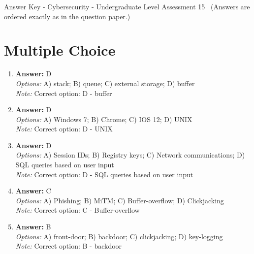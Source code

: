 \documentclass[12pt]{article}
\begin{document}
\begin{center}
Answer Key - Cybersecurity - Undergraduate Level Assessment 15 \
\small (Answers are ordered exactly as in the question paper.)
\end{center}

\section*{Multiple Choice}
\begin{enumerate}[label=\arabic*.]
\item \textbf{Answer:} D
\\ \textit{Options:} A) stack; B) queue; C) external storage; D) buffer
\\ \textit{Note:} Correct option: D - buffer
\item \textbf{Answer:} D
\\ \textit{Options:} A) Windows 7; B) Chrome; C) IOS 12; D) UNIX
\\ \textit{Note:} Correct option: D - UNIX
\item \textbf{Answer:} D
\\ \textit{Options:} A) Session IDs; B) Registry keys; C) Network communications; D) SQL queries based on user input
\\ \textit{Note:} Correct option: D - SQL queries based on user input
\item \textbf{Answer:} C
\\ \textit{Options:} A) Phishing; B) MiTM; C) Buffer-overflow; D) Clickjacking
\\ \textit{Note:} Correct option: C - Buffer-overflow
\item \textbf{Answer:} B
\\ \textit{Options:} A) front-door; B) backdoor; C) clickjacking; D) key-logging
\\ \textit{Note:} Correct option: B - backdoor
\end{enumerate}
\end{document}
